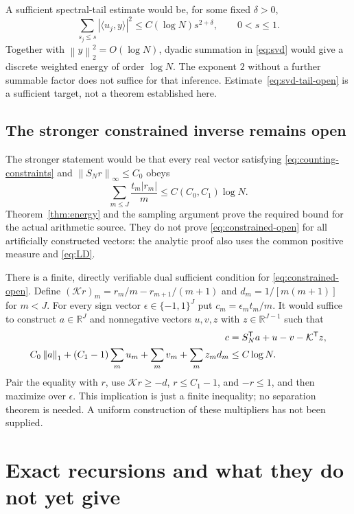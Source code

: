 \documentclass[11pt,letterpaper]{article}
\numberwithin{equation}{section}
\theoremstyle{definition}
\theoremstyle{remark}
\newcommand{\R}{\mathbb R}
\newcommand{\norm}[1]{\left\lVert#1\right\rVert}
\begin{document}
A sufficient spectral-tail estimate would be, for some fixed $\delta>0$,
\begin{equation}\label{eq:svd-tail-open}
 \sum_{s_j\le s}|\langle u_j,y\rangle|^2
 \le C(\log N)s^{2+\delta},\qquad0<s\le1.
\end{equation}
Together with $\norm y_2^2=O(\log N)$, dyadic summation in
\eqref{eq:svd} would give a discrete weighted energy of order $\log N$.
The exponent $2$ without a further summable factor does not suffice for
that inference. Estimate~\eqref{eq:svd-tail-open} is a sufficient target,
not a theorem established here.

\subsection{The stronger constrained inverse remains open}
The stronger statement would be that every real vector satisfying
\eqref{eq:counting-constraints} and
$\norm{S_Nr}_\infty\le C_0$ obeys
\begin{equation}\label{eq:constrained-open}
 \sum_{m\le J}\frac{t_m|r_m|}{m}\le C(C_0,C_1)\log N.
\end{equation}
Theorem~\ref{thm:energy} and the sampling argument prove the required bound
for the actual arithmetic source. They do not prove
\eqref{eq:constrained-open} for all artificially constructed vectors:
the analytic proof also uses the common positive measure and
\eqref{eq:LD}.

There is a finite, directly verifiable dual sufficient condition for
\eqref{eq:constrained-open}. Define
$(\mathcal K r)_m=r_m/m-r_{m+1}/(m+1)$ and $d_m=1/[m(m+1)]$ for $m<J$.
For every sign vector $\epsilon\in\{-1,1\}^J$ put $c_m=\epsilon_mt_m/m$.
It would suffice to construct $a\in\R^J$ and nonnegative vectors $u,v,z$
with $z\in\R^{J-1}$ such that
\begin{align}
 c&=S_N^{\mathsf T}a+u-v-\mathcal K^{\mathsf T}z,\label{eq:dual-open}\\
 C_0\norm a_1+(C_1-1)\sum_m u_m+\sum_m v_m+\sum_m z_md_m
    &\le C\log N.\notag
\end{align}
Pair the equality with $r$, use $\mathcal K r\ge-d$, $r\le C_1-1$, and
$-r\le1$, and then maximize over $\epsilon$.
This implication is just a finite inequality; no separation theorem is
needed. A uniform construction of these multipliers has not been supplied.

\section{Exact recursions and what they do not yet give}\label{sec:recursion}
\end{document}
